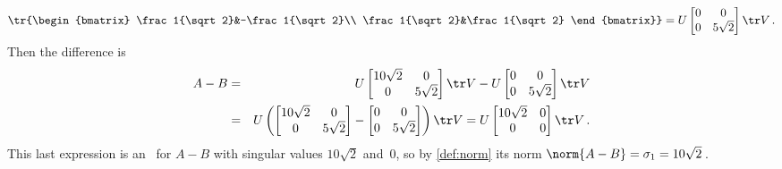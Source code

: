 \begin{example}
\begin{enumerate}
\begin{enumerate}
\begin{solution}
\begin{equation*}
\tr{\begin{bmatrix} \frac1{\sqrt2}&-\frac1{\sqrt2}\\ \frac1{\sqrt2}&\frac1{\sqrt2} \end{bmatrix}}
=U\begin{bmatrix} 0&0\\0&5\sqrt2 \end{bmatrix}\tr V\,.
\end{equation*}
Then the difference is
\begin{eqnarray*}
A-B&=&U\begin{bmatrix} 10\sqrt2&0\\0&5\sqrt2 \end{bmatrix}\tr V
-U\begin{bmatrix} 0&0\\0&5\sqrt2 \end{bmatrix}\tr V
\\&=&U\left(\begin{bmatrix} 10\sqrt2&0\\0&5\sqrt2 \end{bmatrix}
-\begin{bmatrix} 0&0\\0&5\sqrt2 \end{bmatrix}\right)\tr V
=U\begin{bmatrix} 10\sqrt2&0\\0&0 \end{bmatrix}\tr V\,.
\end{eqnarray*}
This last expression is an \svd\ for \(A-B\) with singular values \(10\sqrt2\) and~\(0\), so by \cref{def:norm} its norm \(\norm{A-B}=\sigma_1=10\sqrt2\)\,.
\end{solution}


\end{enumerate}
\end{enumerate}
\end{example}
